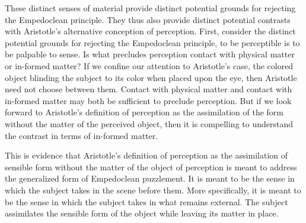 These distinct senses of material provide distinct potential grounds for rejecting the Empedoclean principle. They thus also provide distinct potential contrasts with Aristotle's alternative conception of perception. First, consider the distinct potential grounds for rejecting the Empedoclean principle, to be perceptible is to be palpable to sense. Is what precludes perception contact with physical matter or in-formed matter? If we confine our attention to Aristotle's case, the colored object blinding the subject to its color when placed upon the eye, then Aristotle need not choose between them. Contact with physical matter and contact with in-formed matter may both be sufficient to preclude perception. But if we look forward to Aristotle's definition of perception as the assimilation of the form without the matter of the perceived object, then it is compelling to understand the contrast in terms of in-formed matter. 

This is evidence that Aristotle's definition of perception as the assimilation of sensible form without the matter of the object of perception is meant to address the generalized form of Empedoclean puzzlement. It is meant to be the sense in which the subject takes in the scene before them. More specifically, it is meant to be the sense in which the subject takes in what remains external. The subject assimilates the sensible form of the object while leaving its matter in place. 





